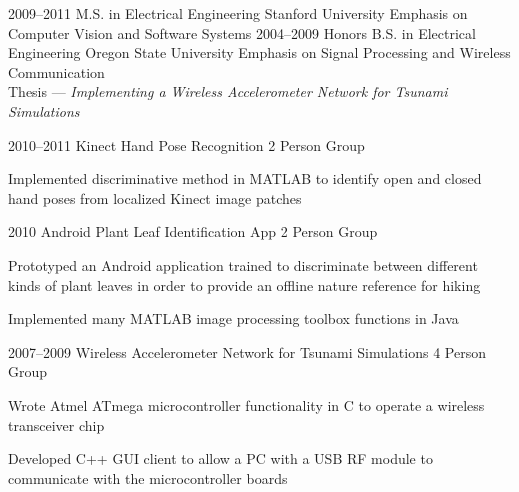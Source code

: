 \documentclass{dvshkn-resume}
\begin{document}
\begin{resumebody}
\sectionbody
{
    \newentry
        {2009--2011}
        {M.S. in Electrical Engineering}
        {Stanford University}
        {Emphasis on Computer Vision and Software Systems}
    \newentry
        {2004--2009}
        {Honors B.S. in Electrical Engineering}
        {Oregon State University}
        {Emphasis on Signal Processing and Wireless Communication\\
        Thesis --- \emph{Implementing a Wireless Accelerometer Network for Tsunami Simulations}}
}

\sectionbody
{
    \newentry
    {2010--2011}
    {Kinect Hand Pose Recognition}
    {2 Person Group}
    {
        \begin{compactitem}
            \item Implemented discriminative method in MATLAB to identify open and closed hand poses from localized Kinect image patches
        \end{compactitem}
    }
    \newentry
    {2010}
    {Android Plant Leaf Identification App}
    {2 Person Group}
    {
        \begin{compactitem}
            \item Prototyped an Android application trained to discriminate between different kinds of plant leaves in order to provide an offline nature reference for hiking
            \item Implemented many MATLAB image processing toolbox functions in Java
        \end{compactitem}
    }
    \newentry
    {2007--2009}
    {Wireless Accelerometer Network for Tsunami Simulations}
    {4 Person Group}
    {
        \begin{compactitem}
            \item Wrote Atmel ATmega microcontroller functionality in C to operate a wireless transceiver chip
            \item Developed C++ GUI client to allow a PC with a USB RF module to communicate with the microcontroller boards
        \end{compactitem}
    }
}

\sectionbody
{
    \nocite{*}
    \printbibliography[type=inproceedings, heading=none]
}

\end{resumebody}
\end{document}
